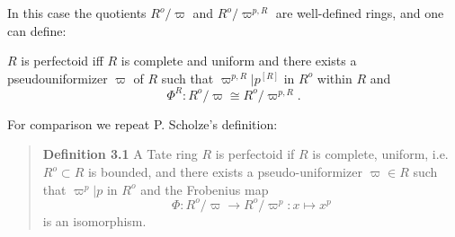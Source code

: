 \documentclass[11pt]{article}
\begin{document}
In this case the quotients $R^o/\varpi$ and $R^o/\varpi^{p,R}$ are well-defined
rings, and one can define:
\begin{forthel}
\begin{definition}
$R$ is perfectoid iff $R$ is complete and uniform and there
exists a pseudouniformizer $\varpi$ of $R$ such that    
$\varpi^{p,R} | p^{[R]}$ in $R^o$ within $R$
and 
\[\Phi^{R} : R^o / \varpi \cong R^o / \varpi^{p,R}.\]
\end{definition}

\end{forthel}

For comparison we repeat P. Scholze's definition:

\begin{quote}
\textbf{Definition 3.1} A Tate ring $R$ is perfectoid if $R$ is complete, uniform,
i.e. $R^o \subset R$ is bounded, and there exists a
pseudo-uniformizer $\varpi \in R$ such that $\varpi^p | p$ in $R^o$ and the
Frobenius map
\[\Phi: R^o/\varpi \rightarrow R^o/\varpi^p : x \mapsto x^p\]
is an isomorphism.
\end{quote}

\printbibliography
\end{document}
